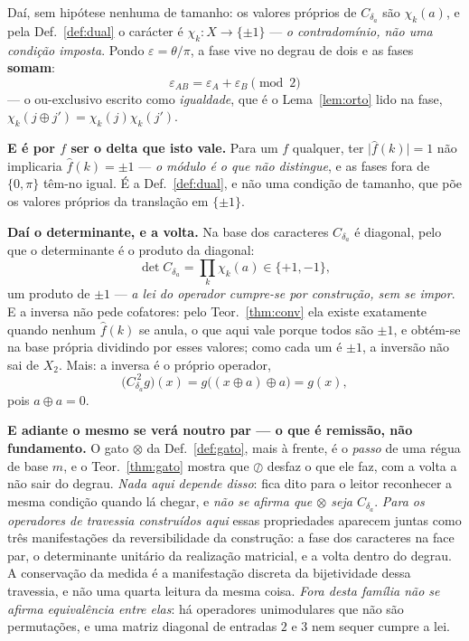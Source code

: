 \documentclass[11pt,a4paper]{article}
\newcommand{\Zc}{\ensuremath{X_2}}
\begin{document}
\medskip\noindent Daí, sem hipótese nenhuma de tamanho: os valores próprios de
$C_{\delta_a}$ são $\chi_k(a)$, e pela Def.~\ref{def:dual} o carácter é
$\chi_k\colon X\to\{\pm1\}$ --- \emph{o contradomínio, não uma condição imposta}. Pondo
$\varepsilon=\theta/\pi$, a fase vive no degrau de dois e as fases \textbf{somam}:
\[
 \boxed{\;\varepsilon_{AB}=\varepsilon_A+\varepsilon_B \pmod 2\;}
\]
--- o ou-exclusivo escrito como \emph{igualdade}, que é o Lema~\ref{lem:orto} lido na
fase, $\chi_k(j\oplus j')=\chi_k(j)\chi_k(j')$.

\medskip\noindent\textbf{E é por $f$ ser o delta que isto vale.} Para um $f$ qualquer,
ter $\lvert\widehat{f}(k)\rvert=1$ não implicaria $\widehat{f}(k)=\pm1$ --- \emph{o
módulo é o que não distingue}, e as fases fora de $\{0,\pi\}$ têm-no igual. É a
Def.~\ref{def:dual}, e não uma condição de tamanho, que põe os valores próprios da
translação em $\{\pm1\}$.

\medskip\noindent\textbf{Daí o determinante, e a volta.} Na base dos caracteres
$C_{\delta_a}$ é diagonal, pelo que o determinante é o produto da diagonal:
\[
 \det C_{\delta_a}=\prod_k\chi_k(a)\in\{+1,-1\},
\]
um produto de $\pm1$ --- \emph{a lei do operador cumpre-se por construção, sem se
impor}. E a inversa não pede cofatores: pelo Teor.~\ref{thm:conv} ela existe exatamente
quando nenhum $\widehat{f}(k)$ se anula, o que aqui vale porque todos são $\pm1$, e
obtém-se na base própria dividindo por esses valores; como cada um é $\pm1$, a inversão
não sai de \Zc. Mais: a inversa é o próprio operador,
\[
 \bigl(C_{\delta_a}^{\,2}g\bigr)(x)=g\bigl((x\oplus a)\oplus a\bigr)=g(x),
\]
pois $a\oplus a=0$.

\medskip\noindent\textbf{E adiante o mesmo se verá noutro par --- o que é remissão, não
fundamento.} O gato $\otimes$ da Def.~\ref{def:gato}, mais à frente, é o \emph{passo} de
uma régua de base $m$, e o Teor.~\ref{thm:gato} mostra que $\oslash$ desfaz o que ele
faz, com a volta a não sair do degrau. \emph{Nada aqui depende disso}: fica dito para o
leitor reconhecer a mesma condição quando lá chegar, e \emph{não se afirma que $\otimes$
seja $C_{\delta_a}$}. \emph{Para os operadores de travessia construídos aqui} essas propriedades aparecem juntas como três manifestações da
reversibilidade da construção: a fase dos caracteres na face par, o determinante
unitário da realização matricial, e a volta dentro do degrau. A conservação da medida é
a manifestação discreta da bijetividade dessa travessia, e não uma quarta leitura da
mesma coisa. \emph{Fora desta família não se afirma equivalência entre elas}: há
operadores unimodulares que não são permutações, e uma matriz diagonal de entradas $2$ e
$3$ nem sequer cumpre a lei.
\end{document}
